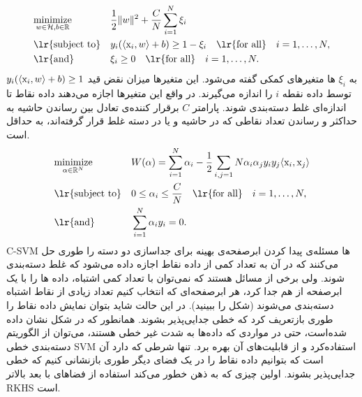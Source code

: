 \begin{equation}\label{eq:c-svm-normal-form}
\begin{aligned}
& \underset{w \in \mH, b \in \R}{\text{minimize}} & & \dfrac{1}{2} \|w\|^2 + \dfrac{C}{N} \sum_{i=1}^{N} \xi_i \\
& \text{\lr{subject to}} & & y_i(\langle \mx_i,w \rangle + b) \geq 1 - \xi_i \quad\text{\lr{for all}}\quad i = 1, \ldots ,N, \\
& \text{\lr{and}} & & \xi_i \geq 0\quad\text{\lr{for all}}\quad i = 1, \ldots ,N.
\end{aligned}
\end{equation}
به $\xi_i$ ها متغیرهای کمکی گفته می‌شود. این متغیرها میزان نقض قید $y_i(\langle \mathrm{x}_i,w \rangle + b) \geq 1$ توسط داده نقطه $i$ را اندازه می‌گیرند. در واقع این متغیرها اجازه می‌دهند داده نقاط تا اندازه‌ای غلط دسته‌بندی شوند. پارامتر $C$ برقرار کننده‌ی تعادل بین رساندن حاشیه به حداکثر و رساندن تعداد نقاطی که در حاشیه و یا در دسته غلط قرار گرفته‌اند، به حداقل است.
\begin{equation}\label{eq:c-svm-dual-form}
\begin{aligned}
& \underset{\alpha \in \R^N}{\text{minimize}} & & W(\alpha)=\sum_{i=1}^{N}\alpha_i - \dfrac{1}{2} \sum_{i,j=1}{N} \alpha_i \alpha_j y_i y_j \langle \mx_i,\mx_j \rangle \\
& \text{\lr{subject to}} & & 0 \leq \alpha_i \leq \dfrac{C}{N} \quad\text{\lr{for all}}\quad i = 1, \ldots ,N, \\
& \text{\lr{and}} & & \sum_{i=1}^{N} \alpha_i y_i = 0.
\end{aligned}
\end{equation}
C-SVM ها مسئله‌ی پیدا کردن ابرصفحه‌ی ‌بهینه برای جداسازی دو دسته را طوری حل می‌کنند که در آن به تعداد کمی از داده نقاط اجازه داده می‌شود که غلط دسته‌بندی شوند. ولی برخی از مسائل هستند که نمی‌توان با تعداد کمی اشتباه، داده ها را با یک ابرصفحه از هم جدا کرد، هر ابرصفحه‌ای که انتخاب کنیم تعداد زیادی از نقاط اشتباه دسته‌بندی می‌شوند (شکل  را ببینید). در این حالت شاید بتوان نمایش داده نقاط را طوری بازتعریف کرد که خطی جدایی‌پذیر بشوند.
همانطور که در شکل   نشان داده شده‌است، حتی در مواردی که داده‌ها به شدت غیر خطی هستند، می‌توان از الگوریتم دسته‌بندی خطی  SVM استفاده‌کرد و از قابلیت‌های آن بهره برد. تنها شرطی که دارد آن است که بتوانیم داده نقاط را در یک فضای دیگر طوری بازنشانی کنیم که خطی جدایی‌پذیر بشوند. اولین چیزی که به ذهن خطور می‌کند استفاده از فضاهای با بعد بالاتر RKHS است.

